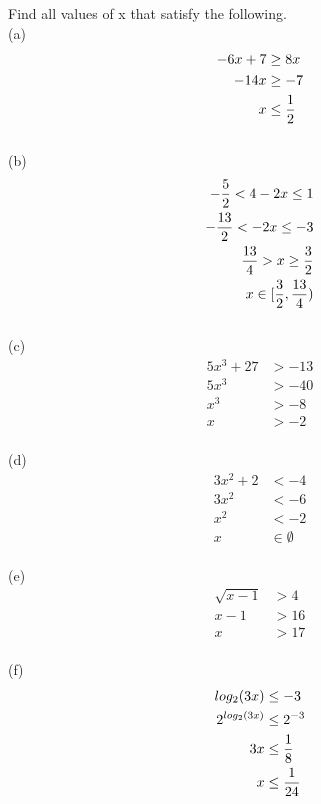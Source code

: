 \begin{exercise}\nonumber
	Find all values of x that satisfy the following. \\

	(a)
	\begin{align}
		-6x + 7 & \ge 8x          \\
		-14x    & \ge -7          \\
		x       & \le {1 \over 2}
	\end{align} \\

	(b)
	\begin{align}
		-{5 \over 2} < 4 - 2x \le 1      \\
		-{13 \over 2} < -2x \le -3       \\
		{13 \over 4} > x \ge {3 \over 2} \\
		x \in [{3 \over 2}, {13 \over 4})
	\end{align} \\

	(c)
	\begin{align}
		5x^3 + 27 & > -13 \\
		5x^3      & > -40 \\
		x^3       & > -8  \\
		x         & > -2
	\end{align} \\

	(d)
	\begin{align}
		3x^2 + 2 & < -4          \\
		3x^2     & < -6          \\
		x^2      & < -2          \\
		x        & \in \emptyset
	\end{align} \\

	(e)
	\begin{align}
		\sqrt{x-1} & > 4  \\
		x - 1      & > 16 \\
		x          & > 17
	\end{align} \\

	(f)
	\begin{align}
		log_2(3x)     & \le -3           \\
		2^{log_2(3x)} & \le 2^{-3}       \\
		3x            & \le {1 \over 8}  \\
		x             & \le {1 \over 24}
	\end{align}
\end{exercise}

